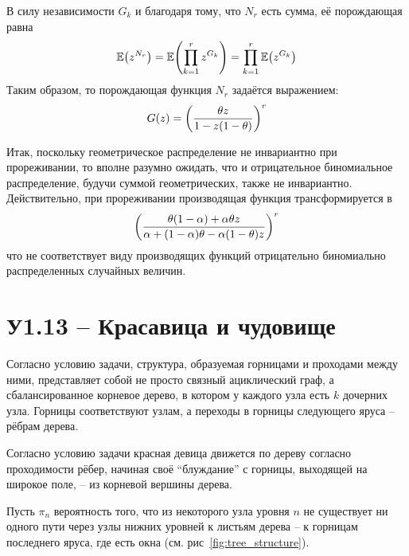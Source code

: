 \documentclass[a4paper]{article}
\let\originalleft\left
\let\originalright\right
\renewcommand{\left}{\mathopen{}\mathclose\bgroup\originalleft}
\renewcommand{\right}{\aftergroup\egroup\originalright}
\newcommand{\brac}[1]{{\left ( #1 \right )}}
\newcommand{\Ex}[0]{{\mathbb{E}}}
\begin{document}
В силу независимости $G_k$ и благодаря тому, что $N_r$ есть сумма,
её порождающая равна
\[\Ex\brac{z^{N_r}}=\Ex\brac{\prod_{k=1}^r z^{G_k}}=\prod_{k=1}^r \Ex\brac{z^{G_k}}\]
Таким образом, то порождающая функция $N_r$ задаётся выражением:
\[G(z) = \brac{\frac{\theta z }{1 - z (1-\theta)}}^r\]

Итак, поскольку геометрическое распределение не инвариантно при прореживании,
то вполне разумно ожидать, что и отрицательное биномиальное распределение,
будучи суммой геометрических, также не инвариантно.
Действительно, при прореживании производящая функция трансформируется в 
\[\brac{\frac{\theta (1 - \alpha) + \alpha \theta z }{\alpha + (1-\alpha) \theta - \alpha (1-\theta) z}}^r\]
что не соответствует виду производящих функций отрицательно биномиально
распределенных случайных величин.



\section{У1.13 -- Красавица и чудовище} %
\label{sec:task_1_13}

Согласно условию задачи, структура, образуемая горницами и проходами
между ними, представляет собой не просто связный ациклический граф, а
сбалансированное корневое дерево, в котором у каждого узла есть $k$
дочерних узла.
Горницы соответствуют узлам, а переходы в горницы следующего яруса
-- рёбрам дерева.

Согласно условию задачи красная девица движется по дереву согласно
проходимости рёбер, начиная своё ``блуждание'' с горницы, выходящей на
широкое поле, -- из корневой вершины дерева.

Пусть $\pi_n$ вероятность того, что из некоторого узла уровня $n$
не существует ни одного пути через узлы нижних уровней к листьям дерева
-- к горницам последнего яруса, где есть окна (см. рис~\ref{fig:tree_structure}).
\end{document}
